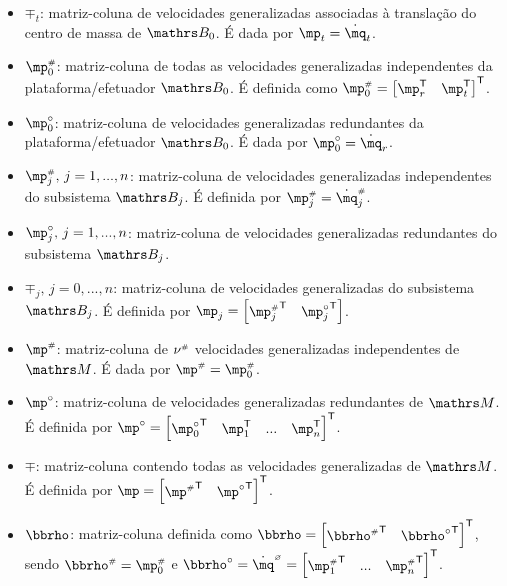 \documentclass[a4paper,11pt,brazil,fleqn]{article}
\begin{document}
\begin{itemize}
\item $\mp_t$: matriz-coluna de velocidades generalizadas associadas \`a transla\c{c}\~ao do centro de massa de $\ssB_0$. \'E dada por $\mp_t = \dot{\mq}_t$.
\item $\mp\ssh_0$: matriz-coluna de todas as velocidades generalizadas independentes da plataforma/efetuador $\ssB_0$. \'E definida como $\mp\ssh_0 = \begin{bmatrix} \mp_r^\msT & \mp_t^\msT \end{bmatrix}^\msT$.
\item $\mp\cir_0$: matriz-coluna de velocidades generalizadas redundantes da plataforma/efetuador $\ssB_0$. \'E dada por $\mp\cir_0 = \dot{\mq}_r$.
\item $\mp_j\ssh, \,j=1, ..., n$: matriz-coluna de velocidades generalizadas independentes do subsistema  $\ssB_j$. \'E definida por $\mp_j\ssh = \dot{\mq}_j\ssh$.
\item $\mp_j\cir, \,j=1, ..., n$: matriz-coluna de velocidades generalizadas redundantes do subsistema  $\ssB_j$.
\item $\mp_j, \,j=0, ..., n$: matriz-coluna de velocidades generalizadas do subsistema  $\ssB_j$. \'E definida por $\mp_j = \begin{bmatrix} {\mp_j\ssh}^\msT & {\mp_j\cir}^\msT \end{bmatrix}$.
\item $\mp\ssh$: matriz-coluna de $\nu^{\scriptscriptstyle \#}$ velocidades generalizadas independentes de $\ssM$. \'E dada por $\mp\ssh = \mp_0\ssh$.
\item $\mp\cir$: matriz-coluna de velocidades generalizadas redundantes de $\ssM$. \'E definida por $\mp\cir = \begin{bmatrix} {\mp\cir_0}^\msT & \mp_1^\msT & ... & \mp_{n}^\msT \end{bmatrix}^\msT $.
\item $\mp$: matriz-coluna contendo todas as velocidades generalizadas de $\ssM$. \'E definida por $\mp = \begin{bmatrix} {\mp\ssh}^\msT & {\mp\cir}^\msT \end{bmatrix}^\msT $.
\item $\mrho$: matriz-coluna definida como $\mrho = \begin{bmatrix} {\mrho\ssh}^\msT & {\mrho\cir}^\msT \end{bmatrix}^\msT $, sendo $\mrho\ssh = \mp_0\ssh$ e $\mrho\cir = \dot{\mq}\hcir = \begin{bmatrix} {\mp\ssh_1}^\msT & ... &  {\mp\ssh_n}^\msT \end{bmatrix}^\msT $.

\end{itemize}
\end{document}
